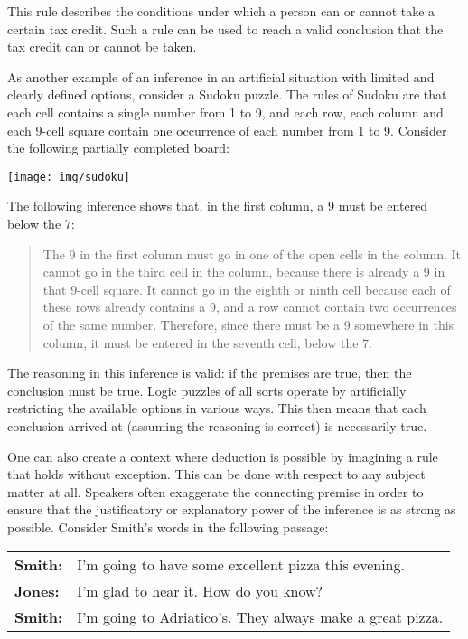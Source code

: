 This rule describes the conditions under which a person can or cannot take a certain tax credit. Such a rule can be used to reach a valid conclusion that the tax credit can or cannot be taken.

As another example of an inference in an artificial situation with limited and clearly defined options, consider a Sudoku puzzle. The rules of Sudoku are that each cell contains a single number from 1 to 9, and each row, each column and each 9-cell square contain one occurrence of each number from 1 to 9. Consider the following partially completed board:

\begin{center}
\noindent \texttt{[image: img/sudoku]}
\end{center}

The following inference shows that, in the first column, a 9 must be entered below the 7:

\begin{quote} The 9 in the first column must go in one of the open cells in the column. It cannot go in the third cell in the column, because there is already a 9 in that 9-cell square. It cannot go in the eighth or ninth cell because each of these rows already contains a 9, and a row cannot contain two occurrences of the same number. Therefore, since there must be a 9 somewhere in this column, it must be entered in the seventh cell, below the 7.\end{quote}

The reasoning in this inference is valid: if the premises are true, then the conclusion must be true. Logic puzzles of all sorts operate by artificially restricting the available options in various ways. This then means that each conclusion arrived at (assuming the reasoning is correct) is necessarily true.

One can also create a context where deduction is possible by imagining a rule that holds without exception. This can be done with respect to any subject matter at all. Speakers often exaggerate the connecting premise in order to ensure that the justificatory or explanatory power of the inference is as strong as possible. Consider Smith's words in the following passage:


\begin{longtabu}{p{.1\linewidth}p{.8\linewidth}}
\textbf{Smith:} & I'm going to have some excellent pizza this evening. \\
\textbf{Jones:} & I'm glad to hear it. How do you know?\\
\textbf{Smith:} & I'm going to Adriatico's. They always make a great pizza. \\
\end{longtabu}

